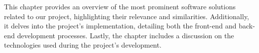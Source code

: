 This chapter provides an overview of the most prominent software solutions related to our project, highlighting their
relevance and similarities.
Additionally, it delves into the project's implementation,
detailing both the front-end and back-end development processes.
Lastly, the chapter includes a discussion on the technologies used during the project's development.
